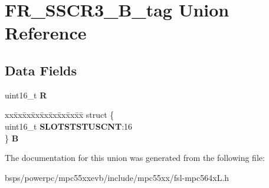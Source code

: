 \hypertarget{unionFR__SSCR3__16B__tag}{}\section{F\+R\+\_\+\+S\+S\+C\+R3\+\_\+B\+\_\+tag Union Reference}
\label{unionFR__SSCR3__16B__tag}
\subsection*{Data Fields}
\begin{DoxyCompactItemize}
\item 
\mbox{\label{unionFR__SSCR3__16B__tag_ad80a62de5de9dd26d8a208ae00aaae13}} 
uint16\+\_\+t {\bfseries R}
\item 
\mbox{\label{unionFR__SSCR3__16B__tag_a4fc774cfc754850b38428b463a3e4530}} 
\begin{tabbing}
xx\=xx\=xx\=xx\=xx\=xx\=xx\=xx\=xx\=\kill
struct \{\\
\>uint16\_t {\bfseries SLOTSTSTUSCNT}:16\\
\} {\bfseries B}\\

\end{tabbing}\end{DoxyCompactItemize}


The documentation for this union was generated from the following file\+:\begin{DoxyCompactItemize}
\item 
bsps/powerpc/mpc55xxevb/include/mpc55xx/fsl-\/mpc564x\+L.\+h\end{DoxyCompactItemize}
